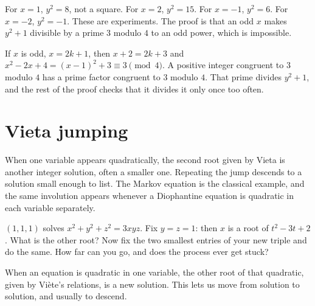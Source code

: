 \begin{examplex}[why $y^2=x^3+7$ fails for small $x$]
For $x=1$, $y^2=8$, not a square. For $x=2$, $y^2=15$. For $x=-1$, $y^2=6$. For $x=-2$, $y^2=-1$. These are experiments. The proof is that an odd $x$ makes $y^2+1$ divisible by a prime $3$ modulo $4$ to an odd power, which is impossible.
\end{examplex}

\begin{examplex}
If $x$ is odd, $x=2k+1$, then $x+2=2k+3$ and $x^2-2x+4=(x-1)^2+3\equiv 3\pmod 4$. A positive integer congruent to $3$ modulo $4$ has a prime factor congruent to $3$ modulo $4$. That prime divides $y^2+1$, and the rest of the proof checks that it divides it only once too often.
\end{examplex}

\section{Vieta jumping}

When one variable appears quadratically, the second root given by Vieta is another integer solution, often a smaller one. Repeating the jump descends to a solution small enough to list. The Markov equation is the classical example, and the same involution appears whenever a Diophantine equation is quadratic in each variable separately.

\begin{think}
$(1,1,1)$ solves $x^2+y^2+z^2=3xyz$. Fix $y=z=1$: then $x$ is a root of $t^2-3t+2$. What is the other root? Now fix the two smallest entries of your new triple and do the same. How far can you go, and does the process ever get stuck?
\end{think}

When an equation is quadratic in one variable, the other root of that quadratic, given by Vi\`ete's relations, is a new solution. This lets us move from solution to solution, and usually to descend.

